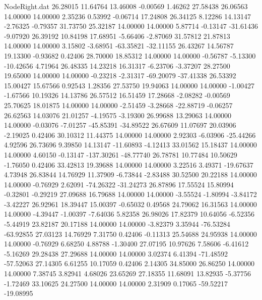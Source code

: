 \begin{filecontents}{NodeRight.dat}
  26.28015   11.64764   13.46008    -0.00569    1.46262   27.58438   26.06563   14.00000   14.00000    2.35236    0.53992   -0.06714   17.24808
  26.34125    8.12286   14.13147    -2.76325   -0.79357   31.73750   25.32187   14.00000   14.00000    5.87714   -0.13147  -31.61436   -9.07920
  26.39192   10.84198   17.68951    -5.66406   -2.87069   31.57812   21.87813   14.00000   14.00000    3.15802   -3.68951  -63.35821  -32.11155
  26.43267   14.56787   19.13300    -0.93682    0.42406   28.70000   18.85312   14.00000   14.00000   -0.56787   -5.13300  -10.42656    4.71964
  26.48335   14.23218   16.31317    -6.23706   -3.37207   28.27500   19.65000   14.00000   14.00000   -0.23218   -2.31317  -69.20079  -37.41338
  26.53392   15.00427   15.67566     0.92543    1.28356   27.53750   19.94063   14.00000   14.00000   -1.00427   -1.67566   10.19326   14.13786
  26.57512   16.51459   17.28668    -2.08282   -0.00569   25.70625   18.01875   14.00000   14.00000   -2.51459   -3.28668  -22.88719   -0.06257
  26.62563   14.03076   21.01257    -4.19575   -3.19300   26.99688   13.29063   14.00000   14.00000   -0.03076   -7.01257  -45.85391  -34.89522
  26.67609   11.07697   20.03906    -2.19025    0.42406   30.10312   11.44375   14.00000   14.00000    2.92303   -6.03906  -25.44266    4.92596
  26.73696    9.39850   14.13147   -11.60893   -4.12413   33.01562   15.18437   14.00000   14.00000    4.60150   -0.13147 -137.30261  -48.77740
  26.78781   10.77484   10.50629    -1.76050    0.42406   33.42813   19.39688   14.00000   14.00000    3.22516    3.49371  -19.67637    4.73948
  26.83844   14.76929   11.37909    -6.73844   -2.83488   30.52500   20.22188   14.00000   14.00000   -0.76929    2.62091  -74.26322  -31.24273
  26.87896   17.55524   15.80994    -0.32801   -0.29219   27.09688   16.79688   14.00000   14.00000   -3.55524   -1.80994   -3.84172   -3.42227
  26.92961   18.39447   15.00397    -0.65032    0.49568   24.79062   16.31563   14.00000   14.00000   -4.39447   -1.00397   -7.64036    5.82358
  26.98026   17.82379   10.64056    -6.52356   -5.44919   23.82187   20.17188   14.00000   14.00000   -3.82379    3.35944  -76.53284  -63.92855
  27.03123   14.76929    7.31750     0.42406   -0.11313   25.54688   24.95938   14.00000   14.00000   -0.76929    6.68250    4.88788   -1.30400
  27.07195   10.97626    7.58606    -6.41612   -5.16269   29.28438   27.29688   14.00000   14.00000    3.02374    6.41394  -71.48592  -57.52063
  27.14305    6.61255   10.17059     0.42406    2.14305   34.85000   26.86250   14.00000   14.00000    7.38745    3.82941    4.68026   23.65269
  27.18355   11.68091   13.82935    -5.37756   -1.72469   33.10625   24.27500   14.00000   14.00000    2.31909    0.17065  -59.52217  -19.08995

\end{filecontents}
